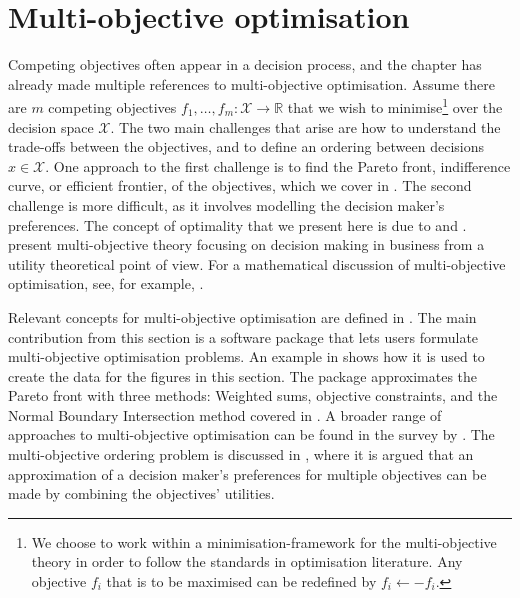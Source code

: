 \documentclass[main.tex]{subfiles}
\begin{document}
\section{Multi-objective optimisation}\label{sec:one_multi-objective}
Competing objectives often appear in a decision process, and the chapter
has already made multiple references to multi-objective optimisation.  Assume
there are $m$ competing objectives
$f_1,\dots,f_m:\mathcal{X}\to\mathbb{R}$ that we wish to
minimise\footnote{We choose to work within a minimisation-framework
  for the multi-objective theory in order to follow the standards in
  optimisation literature. Any objective $f_i$ that is to be maximised
  can be redefined by $f_i\leftarrow -f_i$.} over the decision space
$\mathcal{X}$. The two main challenges that arise are how to understand
the trade-offs between the objectives, and to define an ordering
between decisions $x\in\mathcal{X}$.  One approach to the first
challenge is to find the Pareto front, indifference curve, or efficient
frontier, of the objectives, which we cover in
. The second challenge is more difficult,
as it involves modelling the decision maker's preferences.
The concept of optimality that we present here is due to
\citet{edgeworth1881mathematical} and \citet{pareto1906manuale}.
\citet{keeney1976decisions} present multi-objective theory focusing on
decision making in business from a utility theoretical point of view.
For a mathematical discussion of multi-objective optimisation, see,
for example, \citet{jahn2011vector}.

Relevant concepts for multi-objective optimisation are defined in
.  The main contribution from this section
is a software package that lets users formulate
multi-objective optimisation problems.  An example in
 shows how it is used to create the data for
the figures in this section.  The package approximates the Pareto
front with
three methods: Weighted sums, objective
constraints, and the Normal Boundary Intersection method covered in
.  A broader range of
approaches to multi-objective optimisation can be found in the survey
by \citet{marler2004survey}.  The multi-objective ordering problem is
discussed in , where it is argued that an
approximation of a decision maker's preferences for multiple
objectives can be made by combining the objectives' utilities.
\end{document}
